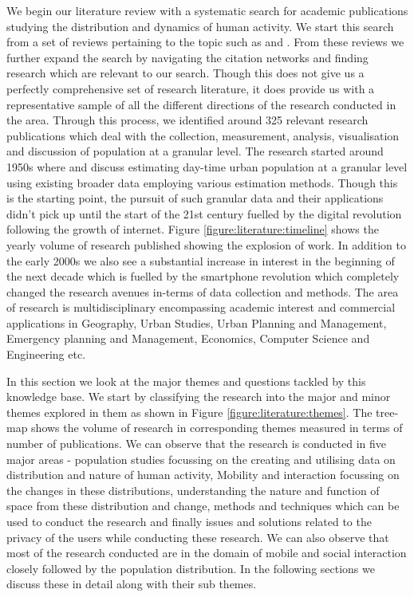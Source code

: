 We begin our literature review with a systematic search for academic publications studying the distribution and dynamics of human activity.
We start this search from a set of reviews pertaining to the topic such as \citet{ratti2006,jiang2013,steenbruggen2013,arribas-bel2014} and \citet{li2016geospatial}.
From these reviews we further expand the search by navigating the citation networks and finding research which are relevant to our search.
Though this does not give us a perfectly comprehensive set of research literature, it does provide us with a representative sample of all the different directions of the research conducted in the area.
Through this process, we identified around 325 relevant research publications which deal with the collection, measurement, analysis, visualisation and discussion of population at a granular level.
The research started around 1950s where \citet{foley1954} and \citet{schmitt1956} discuss estimating day-time urban population at a granular level using existing  broader data employing various estimation methods.
Though this is the starting point, the pursuit of such granular data and their applications didn't pick up until the start of the 21st century fuelled by the digital revolution following the growth of internet.
Figure \ref{figure:literature:timeline} shows the yearly volume of research published showing the explosion of work.
In addition to the early 2000s we also see a substantial increase in interest in the beginning of the next decade which is fuelled by the smartphone revolution which completely changed the research avenues in-terms of data collection and methods.
The area of research is multidisciplinary encompassing academic interest and commercial applications in Geography, Urban Studies, Urban Planning and Management, Emergency planning and Management, Economics, Computer Science and Engineering etc.

In this section we look at the major themes and questions tackled by this knowledge base.
We start by classifying the research into the major and minor themes explored in them as shown in Figure \ref{figure:literature:themes}.
The tree-map shows the volume of research in corresponding themes measured in terms of number of publications.
We can observe that the research is conducted in five major areas - population studies focussing on the creating and utilising data on distribution and nature of human activity, Mobility and interaction focussing on the changes in these distributions, understanding the nature and function of space from these distribution and change, methods and techniques which can be used to conduct the research and finally issues and solutions related to the privacy of the users while conducting these research.
We can also observe that most of the research conducted are in the domain of mobile and social interaction closely followed by the population distribution.
In the following sections we discuss these in detail along with their sub themes.

